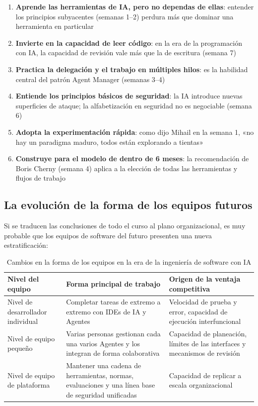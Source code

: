 \begin{enumerate}
    \item \textbf{Aprende las herramientas de IA, pero no dependas de ellas}: entender los principios subyacentes (semanas 1--2) perdura más que dominar una herramienta en particular
    \item \textbf{Invierte en la capacidad de leer código}: en la era de la programación con IA, la capacidad de revisión vale más que la de escritura (semana 7)
    \item \textbf{Practica la delegación y el trabajo en múltiples hilos}: es la habilidad central del patrón Agent Manager (semanas 3--4)
    \item \textbf{Entiende los principios básicos de seguridad}: la IA introduce nuevas superficies de ataque; la alfabetización en seguridad no es negociable (semana 6)
    \item \textbf{Adopta la experimentación rápida}: como dijo Mihail en la semana 1, «no hay un paradigma maduro, todos están explorando a tientas»
    \item \textbf{Construye para el modelo de dentro de 6 meses}: la recomendación de Boris Cherny (semana 4) aplica a la elección de todas las herramientas y flujos de trabajo
\end{enumerate}

\subsection{La evolución de la forma de los equipos futuros}

Si se traducen las conclusiones de todo el curso al plano organizacional, es muy probable que los equipos de software del futuro presenten una nueva estratificación:

\begin{table}[H]
\centering
\begin{tabular}{p{} p{} p{}}
\toprule
Nivel del equipo & Forma principal de trabajo & Origen de la ventaja competitiva \\
\midrule
Nivel de desarrollador individual & Completar tareas de extremo a extremo con IDEs de IA y Agentes & Velocidad de prueba y error, capacidad de ejecución interfuncional \\
Nivel de equipo pequeño & Varias personas gestionan cada una varios Agentes y los integran de forma colaborativa & Capacidad de planeación, límites de las interfaces y mecanismos de revisión \\
Nivel de equipo de plataforma & Mantener una cadena de herramientas, normas, evaluaciones y una línea base de seguridad unificadas & Capacidad de replicar a escala organizacional \\
\bottomrule
\end{tabular}
\caption{Cambios en la forma de los equipos en la era de la ingeniería de software con IA}
\end{table}

